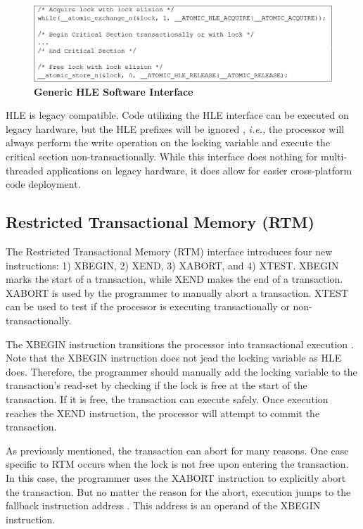 \documentclass[11pt]{book}
\begin{document}
\begin{figure}[H]
    \centering
    \graphicspath{ {./figures/} }
    \includegraphics[width=\textwidth,height=\textheight,keepaspectratio]{fig_hleInterface}
    \caption{\textbf{Generic HLE Software Interface}}
    \label{fig:hle_interface}
\end{figure}

HLE is legacy compatible.  Code utilizing the HLE interface can be executed on legacy
hardware, but the HLE prefixes will be ignored \cite{intel_prog_ref}, \emph{i.e.,} the
processor will always perform the write operation on the locking variable and execute the
critical section non-transactionally.  While this interface does nothing for
multi-threaded applications on legacy hardware, it does allow for easier cross-platform
code deployment.

\subsection{Restricted Transactional Memory (RTM)}\label{sec:rtm}

The Restricted Transactional Memory (RTM) interface introduces four new instructions: 1)
XBEGIN, 2) XEND, 3) XABORT, and 4) XTEST.  XBEGIN marks the start of a transaction, while
XEND makes the end of a transaction.  XABORT is used by the programmer to manually abort a
transaction.  XTEST can be used to test if the processor is executing transactionally or
non-transactionally.

The XBEGIN instruction transitions the processor into transactional execution
\cite{intel_prog_ref}.  Note that the XBEGIN instruction does not jead the
locking variable as HLE does.  Therefore, the programmer should manually add the
locking variable to the transaction's read-set by checking if the lock is free
at the start of the transaction.  If it is free, the transaction can execute
safely.  Once execution reaches the XEND instruction, the processor will attempt
to commit the transaction.

As previously mentioned, the transaction can abort for many reasons.  One case specific to
RTM occurs when the lock is not free upon entering the transaction.  In this case, the
programmer uses the XABORT instruction to explicitly abort the transaction.  But no matter
the reason for the abort, execution jumps to the fallback instruction address
\cite{intel_prog_ref}.  This address is an operand of the XBEGIN instruction.
\end{document}
